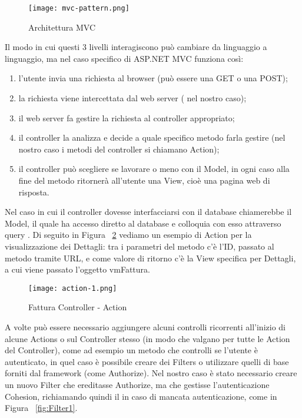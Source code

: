 \begin{figure}[H]
    \centering
    \texttt{[image: mvc-pattern.png]}
    \caption{Architettura MVC}
    \label{fig:Mvc}
\end{figure}

Il modo in cui questi 3 livelli interagiscono può cambiare da linguaggio a linguaggio, ma nel caso specifico di ASP.NET MVC funziona così:
\begin{enumerate}
    \item l'utente invia una richiesta al browser (può essere una GET o una POST);
    \item la richiesta viene intercettata dal web server ( nel nostro caso);
    \item il web server fa gestire la richiesta al controller appropriato;
    \item il controller la analizza e decide a quale specifico metodo farla gestire (nel nostro caso i metodi del controller si chiamano Action);
    \item il controller può scegliere se lavorare o meno con il Model, in ogni caso alla fine del metodo ritornerà all'utente una View, cioè una pagina web di risposta.
\end{enumerate}
Nel caso in cui il controller dovesse interfacciarsi con il database chiamerebbe il Model, il quale ha accesso diretto al database e colloquia con esso attraverso query .
Di seguito in Figura ~\ref{fig:Action1} vediamo un esempio di Action per la visualizzazione dei Dettagli: tra i parametri del metodo c'è l'ID, passato al metodo tramite URL, e come valore di ritorno c'è la View specifica per Dettagli, a cui viene passato l'oggetto vmFattura.

\begin{figure}[H]
    \centering
    \texttt{[image: action-1.png]}
    \caption{Fattura Controller - Action }
    \label{fig:Action1}
\end{figure}

A volte può essere necessario aggiungere alcuni controlli ricorrenti all'inizio di alcune Actions o sul Controller stesso (in modo che valgano per tutte le Action del Controller), come ad esempio un metodo che controlli se l'utente è autenticato, in quel caso è possibile creare dei Filters o utilizzare quelli di base forniti dal framework (come Authorize).
Nel nostro caso è stato necessario creare un nuovo Filter che ereditasse Authorize, ma che gestisse l'autenticazione Cohesion, richiamando quindi il  in caso di mancata autenticazione, come in Figura ~\ref{fig:Filter1}.

